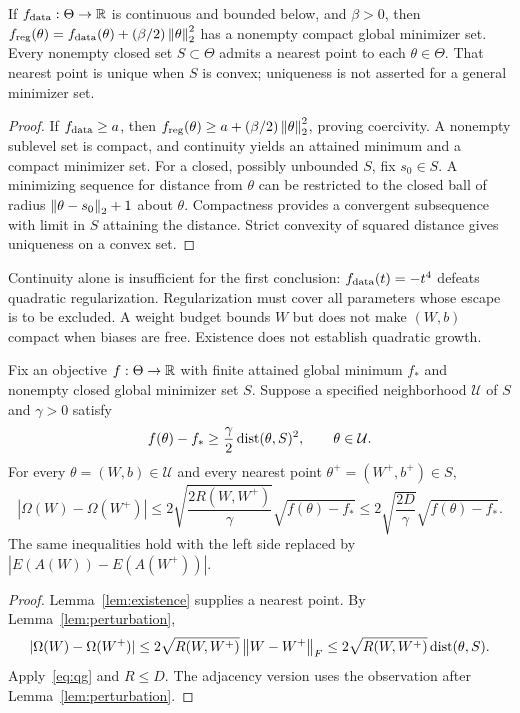 \begin{lemma}\label{lem:existence}
If $f_{\rm data}:\Theta\to\mathbb R$ is continuous and bounded below, and $\beta>0$, then
$f_{\rm reg}(\theta)=f_{\rm data}(\theta)+(\beta/2)\left\lVert\theta\right\rVert_2^2$
has a nonempty compact global minimizer set. Every nonempty closed set $S\subset\Theta$ admits a nearest point to each $\theta\in\Theta$. That nearest point is unique when $S$ is convex; uniqueness is not asserted for a general minimizer set.
\end{lemma}
\begin{proof}
If $f_{\rm data}\ge a$, then $f_{\rm reg}(\theta)\ge a+(\beta/2)\left\lVert\theta\right\rVert_2^2$, proving coercivity. A nonempty sublevel set is compact, and continuity yields an attained minimum and a compact minimizer set. For a closed, possibly unbounded $S$, fix $s_0\in S$. A minimizing sequence for distance from $\theta$ can be restricted to the closed ball of radius $\left\lVert\theta-s_0\right\rVert_2+1$ about $\theta$. Compactness provides a convergent subsequence with limit in $S$ attaining the distance. Strict convexity of squared distance gives uniqueness on a convex set.
\end{proof}
Continuity alone is insufficient for the first conclusion: $f_{\rm data}(t)=-t^4$ defeats quadratic regularization. Regularization must cover all parameters whose escape is to be excluded. A weight budget bounds $W$ but does not make $(W,b)$ compact when biases are free. Existence does not establish quadratic growth.

\begin{theorem}\label{thm:qg}
Fix an objective $f:\Theta\to\mathbb R$ with finite attained global minimum $f_*$ and nonempty closed global minimizer set $S$. Suppose a specified neighborhood $\mathcal U$ of $S$ and $\gamma>0$ satisfy
\begin{equation}\label{eq:qg}
 f(\theta)-f_*\ge\frac\gamma2\operatorname{dist}(\theta,S)^2,
 \qquad\theta\in\mathcal U.
\end{equation}
For every $\theta=(W,b)\in\mathcal U$ and every nearest point $\theta^+=(W^+,b^+)\in S$,
\begin{equation}\label{eq:stability}
 |\Omega(W)-\Omega(W^+)|
 \le2\sqrt{\frac{2R(W,W^+)}\gamma}\sqrt{f(\theta)-f_*}
 \le2\sqrt{\frac{2D}\gamma}\sqrt{f(\theta)-f_*}.
\end{equation}
The same inequalities hold with the left side replaced by $|E(A(W))-E(A(W^+))|$.
\end{theorem}
\begin{proof}
Lemma~\ref{lem:existence} supplies a nearest point. By Lemma~\ref{lem:perturbation},
\[
 |\Omega(W)-\Omega(W^+)|\le2\sqrt{R(W,W^+)}\left\lVert W-W^+\right\rVert_F
 \le2\sqrt{R(W,W^+)}\operatorname{dist}(\theta,S).
\]
Apply~\eqref{eq:qg} and $R\le D$. The adjacency version uses the observation after Lemma~\ref{lem:perturbation}.
\end{proof}

